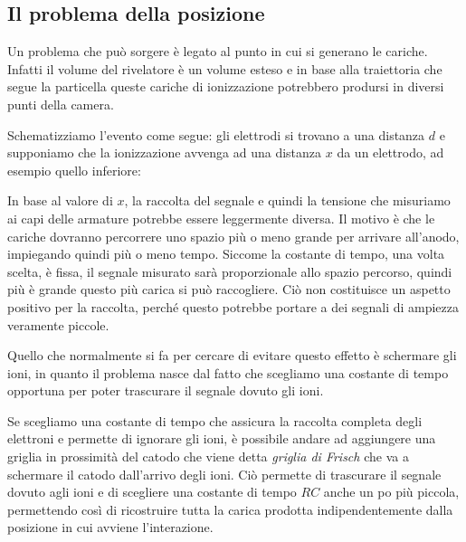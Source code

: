 \subsection{Il problema della posizione}
Un problema che può sorgere è legato al punto in cui si generano le cariche. Infatti il volume del rivelatore è un volume esteso e in base alla traiettoria che segue la particella queste cariche di ionizzazione potrebbero prodursi in diversi punti della camera.

Schematizziamo l'evento come segue: gli elettrodi si trovano a una distanza $d$ e supponiamo che la ionizzazione avvenga ad una distanza $x$ da un elettrodo, ad esempio quello inferiore:

\begin{figure}[H]
   \centering
\end{figure}

In base al valore di $x$, la raccolta del segnale e quindi la tensione che misuriamo ai capi delle armature potrebbe essere leggermente diversa. Il motivo è che le cariche dovranno percorrere uno spazio più o meno grande per arrivare all'anodo, impiegando quindi più o meno tempo. Siccome la costante di tempo, una volta scelta, è fissa, il segnale misurato sarà proporzionale allo spazio percorso, quindi più è grande questo più carica si può raccogliere. Ciò non costituisce un aspetto positivo per la raccolta, perché questo potrebbe portare a dei segnali di ampiezza veramente piccole.

Quello che normalmente si fa per cercare di evitare questo effetto è schermare gli ioni, in quanto il problema nasce dal fatto che scegliamo una costante di tempo opportuna per poter trascurare il segnale dovuto gli ioni.

Se scegliamo una costante di tempo che assicura la raccolta completa degli elettroni e permette di ignorare gli ioni, è possibile andare ad aggiungere una griglia in prossimità del catodo che viene detta \textit{griglia di Frisch} che va a schermare il catodo dall'arrivo degli ioni. Ciò permette di trascurare il segnale dovuto agli ioni e di scegliere una costante di tempo $RC$ anche un po più piccola, permettendo così di ricostruire tutta la carica prodotta indipendentemente dalla posizione in cui avviene l'interazione. 

